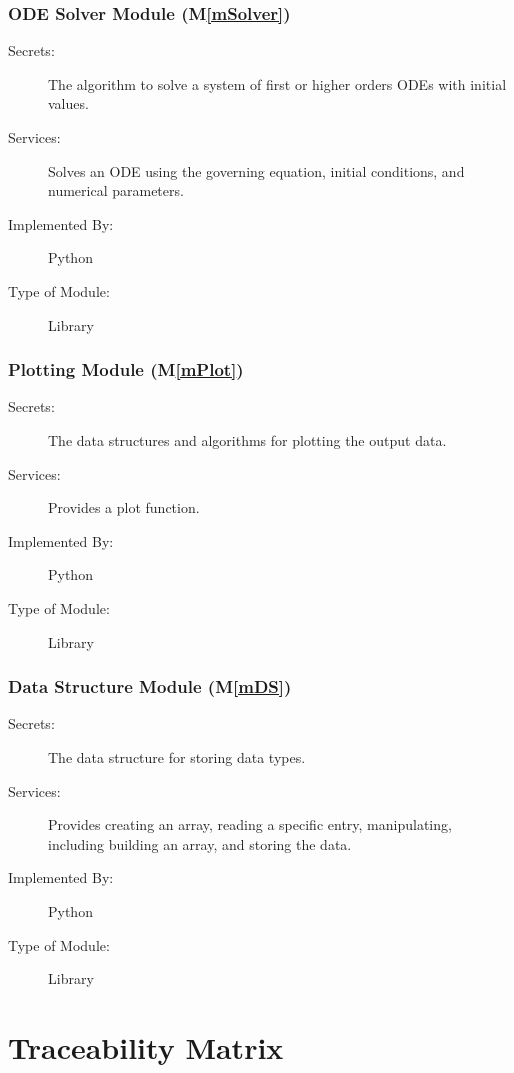 \documentclass[12pt, titlepage]{article}
\newcommand{\mref}[1]{M\ref{#1}}
\begin{document}
\subsubsection{ODE Solver Module (\mref{mSolver})}

\begin{description}
\item[Secrets:] The algorithm to solve a system of first or higher orders ODEs with initial values.
\item[Services:] Solves an ODE using the governing equation, initial conditions, and numerical parameters.
\item[Implemented By:] Python
\item[Type of Module:] Library
\end{description}

\subsubsection{Plotting Module (\mref{mPlot})}

\begin{description}
\item[Secrets:] The data structures and algorithms for plotting the output data.
\item[Services:] Provides a plot function.
\item[Implemented By:] Python
\item[Type of Module:] Library
\end{description}

\subsubsection{ Data Structure Module (\mref{mDS})}

\begin{description}
\item[Secrets:] The data structure for storing data types.
\item[Services:] Provides creating an array, reading a specific entry, manipulating, including building an array, and storing the data.
\item[Implemented By:] Python
\item[Type of Module:] Library
\end{description}

\section{Traceability Matrix} \label{SecTM}
\end{document}
